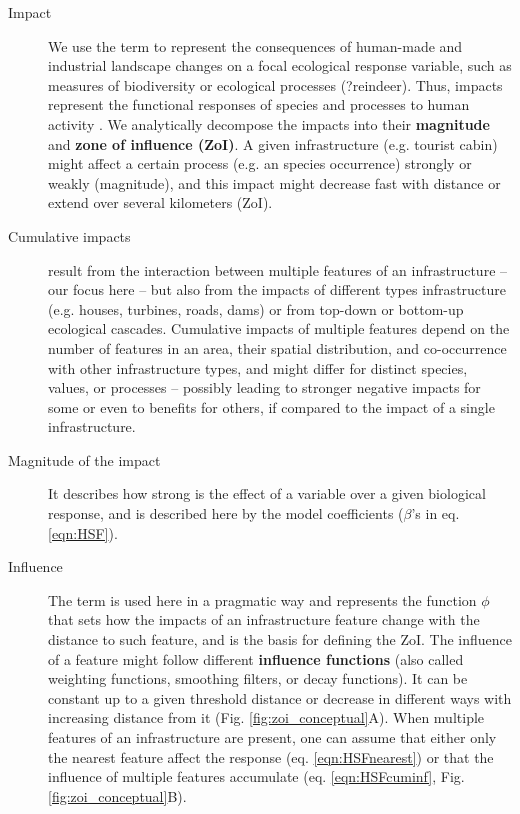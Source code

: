 \documentclass[titlepage]{article}
\begin{document}
\begin{tcolorbox}[width=1.3\textwidth,center,colback=yellow!5,colframe=yellow!75!black,title={Box 1 -- Definitions}]

\begin{description}

    \item[Impact] We use the term to represent the consequences of human-made and industrial landscape changes on a focal ecological response variable, such as measures of biodiversity or ecological processes (?reindeer). Thus, impacts represent the functional responses of species and processes to human activity \citep{naugle_unifying_2011}. We analytically decompose the impacts into their \textbf{magnitude} and \textbf{zone of influence (ZoI)}. A given infrastructure (e.g. tourist cabin) might affect a certain process (e.g. an species occurrence) strongly or weakly (magnitude), and this impact might decrease fast with distance or extend over several kilometers (ZoI).
    
    \item[Cumulative impacts] result from the interaction between multiple features of an infrastructure -- our focus here -- but also from the impacts of different types infrastructure (e.g. houses, turbines, roads, dams) or from top-down or bottom-up ecological cascades. Cumulative impacts of multiple features depend on the number of features in an area, their spatial distribution, and co-occurrence with other infrastructure types, and might differ for distinct species, values, or processes -- possibly leading to stronger negative impacts for some or even to benefits for others, if compared to the impact of a single infrastructure.
    
    \item[Magnitude of the impact] It describes how strong is the effect of a variable over a given biological response, and is described here by the model coefficients ($\beta$'s in eq. \ref{eqn:HSF}). 
    
    \item[Influence] The term is used here in a pragmatic way and represents the function $\phi$ that sets how the impacts of an infrastructure feature change with the distance to such feature, and is the basis for defining the ZoI. The influence of a feature might follow different \textbf{influence functions} (also called weighting functions, smoothing filters, or decay functions). It can be constant up to a given threshold distance or decrease in different ways with increasing distance from it (Fig. \ref{fig:zoi_conceptual}A). When multiple features of an infrastructure are present, one can assume that either only the nearest feature affect the response (eq. \ref{eqn:HSFnearest}) or that the influence of multiple features accumulate (eq. \ref{eqn:HSFcuminf}, Fig. \ref{fig:zoi_conceptual}B).
    

\end{description}
\end{tcolorbox}
\end{document}

